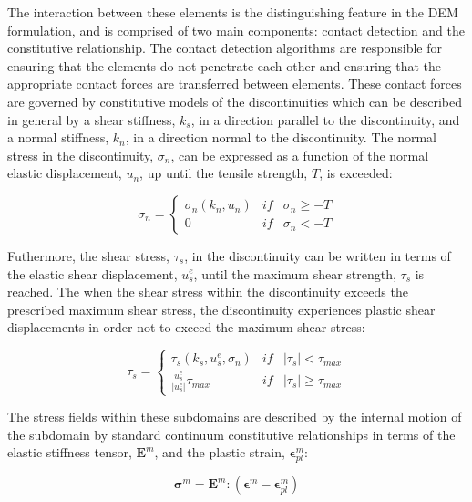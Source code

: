 
The interaction between these elements is the distinguishing feature in the DEM formulation, and is comprised of two main components: contact detection and the constitutive relationship. The contact detection algorithms are responsible for ensuring that the elements do not penetrate each other and ensuring that the appropriate contact forces are transferred between elements. These contact forces are governed by constitutive models of the discontinuities which can be described in general by a shear stiffness, $k_s$, in a direction parallel to the discontinuity, and a normal stiffness, $k_n$, in a direction normal to the discontinuity. The normal stress in the discontinuity, $\sigma_n$, can be expressed as a function of the normal elastic displacement, $u_n$, up until the tensile strength, $T$, is exceeded: 

\begin{equation}
\sigma_n=\left\{\begin{matrix}
\sigma_n\left(k_n, u_n\right) &if&\sigma_n \geq -T\\ 
 0 & if &\sigma_n < -T
\end{matrix}\right.
\label{eqn:demnormal}
\end{equation}

Futhermore, the shear stress, $\tau_s$, in the discontinuity can be written in terms of the elastic shear displacement, $u_s^e$, until the maximum shear strength, $\tau_s$ is reached. The when the shear stress within the discontinuity exceeds the prescribed maximum shear stress, the discontinuity experiences plastic shear displacements in order not to exceed the maximum shear stress:

\begin{equation}
\tau_s=\left\{\begin{matrix}
\tau_s\left(k_s,u_s^e, \sigma_n\right) &if&\left |\tau_{s} \right | < \tau_{max}\\ 
\frac{u_s^e}{\left|u_s^e\right|}\tau_{max} & if &\left |\tau_{s} \right | \geq \tau_{max}
\end{matrix}\right.
\label{eqn:demshear}
\end{equation}

The stress fields within these subdomains are described by the internal motion of the subdomain by standard continuum constitutive relationships in terms of the elastic stiffness tensor, $\mathbf{E}^m$, and the plastic strain, $\boldsymbol{\epsilon}^m_{pl}$:  

\begin{equation}
\boldsymbol{\sigma}^m =\mathbf{E}^m:\left(\boldsymbol{\epsilon}^m - \boldsymbol{\epsilon}^m_{pl}\right)
\label{eqn:demcont}
\end{equation}
